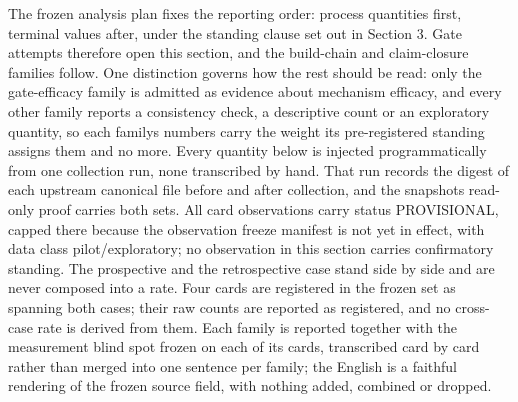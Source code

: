 \documentclass[
  english,
]{article}
\begin{document}
The frozen analysis plan fixes the reporting order: process quantities first, terminal values after, under the standing clause set out in Section 3. Gate attempts therefore open this section, and the build-chain and claim-closure families follow. One distinction governs how the rest should be read: only the gate-efficacy family is admitted as evidence about mechanism efficacy, and every other family reports a consistency check, a descriptive count or an exploratory quantity, so each family\textquotesingle s numbers carry the weight its pre-registered standing assigns them and no more. Every quantity below is injected programmatically from one collection run, none transcribed by hand. That run records the digest of each upstream canonical file before and after collection, and the snapshot\textquotesingle s read-only proof carries both sets. All card observations carry status PROVISIONAL, capped there because the observation freeze manifest is not yet in effect, with data class pilot/exploratory; no observation in this section carries confirmatory standing. The prospective and the retrospective case stand side by side and are never composed into a rate. Four cards are registered in the frozen set as spanning both cases; their raw counts are reported as registered, and no cross-case rate is derived from them. Each family is reported together with the measurement blind spot frozen on each of its cards, transcribed card by card rather than merged into one sentence per family; the English is a faithful rendering of the frozen source field, with nothing added, combined or dropped.
\end{document}
